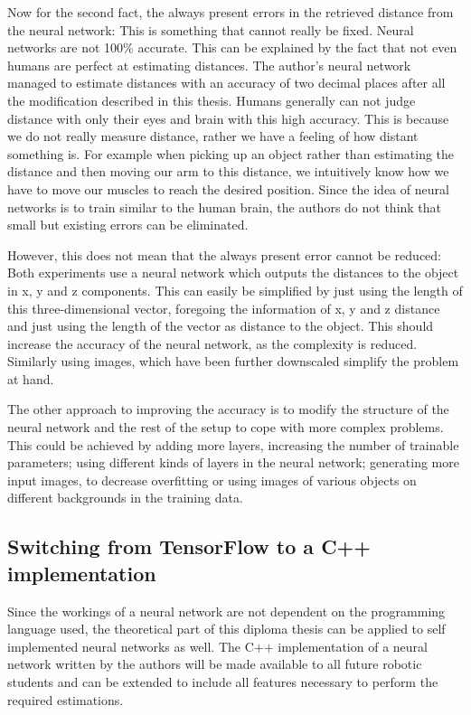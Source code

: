 Now for the second fact, the always present errors in the retrieved distance from the neural network: This is something that cannot really be fixed. Neural networks are not 100\% accurate. This can be explained by the fact that not even humans are perfect at estimating distances. The author's neural network managed to estimate distances with an accuracy of two decimal places after all the modification described in this thesis. Humans generally can not judge distance with only their eyes and brain with this high accuracy. This is because we do not really measure distance, rather we have a feeling of how distant something is. For example when picking up an object rather than estimating the distance and then moving our arm to this distance, we intuitively know how we have to move our muscles to reach the desired position. Since the idea of neural networks is to train similar to the human brain, the authors do not think that small but existing errors can be eliminated. 

However, this does not mean that the always present error cannot be reduced: Both experiments use a neural network which outputs the distances to the object in x, y and z components. This can easily be simplified by just using the length of this three-dimensional vector, foregoing the information of x, y and z distance and just using the length of the vector as distance to the object. This should increase the accuracy of the neural network, as the complexity is reduced. Similarly using images, which have been further downscaled simplify the problem at hand.

The other approach to improving the accuracy is to modify the structure of the neural network and the rest of the setup to cope with more complex problems. This could be achieved by adding more layers, increasing the number of trainable parameters; using different kinds of layers in the neural network; generating more input images, to decrease overfitting or using images of various objects on different backgrounds in the training data.

\subsection{Switching from TensorFlow to a C++ implementation}
Since the workings of a neural network are not dependent on the programming language used, the theoretical part of this diploma thesis can be applied to self implemented neural networks as well. The C++ implementation of a neural network written by the authors will be made available to all future robotic students and can be extended to include all features necessary to perform the required estimations.

